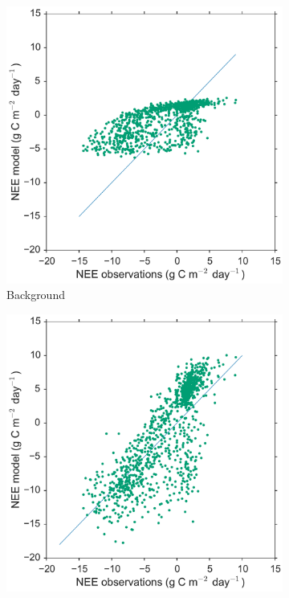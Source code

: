 \begin{figure}
    \centering
     \begin{subfigure}[b]{0.4\textwidth}
        \includegraphics[width=\textwidth]{chapter/chapter6/xbfscat2.pdf}
        \caption{Background}
        \label{chap6:fig:forecastscatxb}
    \end{subfigure}
    \begin{subfigure}[b]{0.4\textwidth}
        \includegraphics[width=\textwidth]{chapter/chapter6/Afscat2.pdf}

\end{subfigure}
\end{figure}
